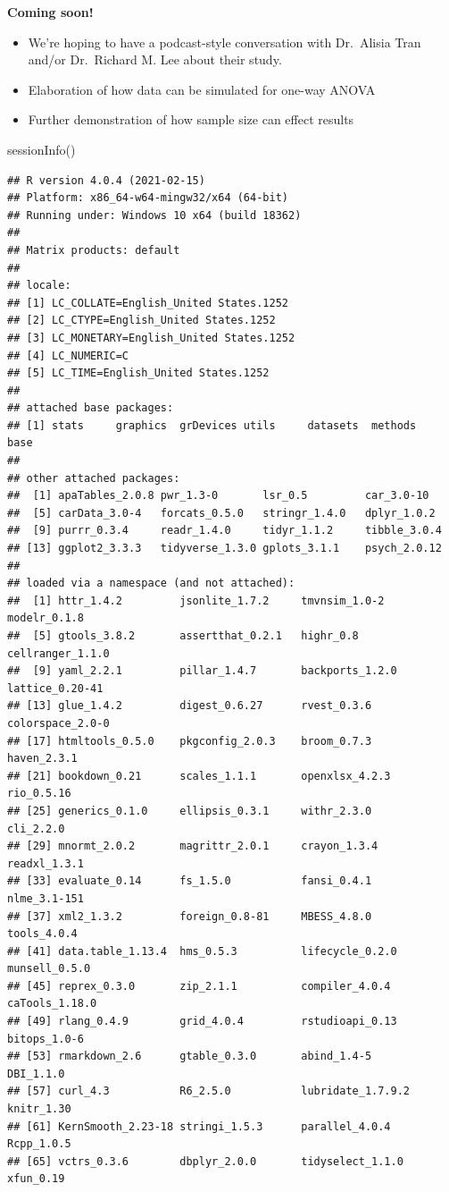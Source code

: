 \documentclass[
  english,
]{book}
\newenvironment{Shaded}{\begin{snugshade}}{\end{snugshade}}
\newcommand{\FunctionTok}[1]{\textcolor[rgb]{0.00,0.00,0.00}{#1}}
\newcommand{\NormalTok}[1]{#1}
\providecommand{\tightlist}{%
  \setlength{\itemsep}{0pt}\setlength{\parskip}{0pt}}
\begin{document}
\textbf{Coming soon!}

\begin{itemize}
\tightlist
\item
  We're hoping to have a podcast-style conversation with Dr.~Alisia Tran and/or Dr.~Richard M. Lee about their study.
\item
  Elaboration of how data can be simulated for one-way ANOVA
\item
  Further demonstration of how sample size can effect results
\end{itemize}

\begin{Shaded}
\begin{Highlighting}[]
\FunctionTok{sessionInfo}\NormalTok{()}
\end{Highlighting}
\end{Shaded}

\begin{verbatim}
## R version 4.0.4 (2021-02-15)
## Platform: x86_64-w64-mingw32/x64 (64-bit)
## Running under: Windows 10 x64 (build 18362)
## 
## Matrix products: default
## 
## locale:
## [1] LC_COLLATE=English_United States.1252 
## [2] LC_CTYPE=English_United States.1252   
## [3] LC_MONETARY=English_United States.1252
## [4] LC_NUMERIC=C                          
## [5] LC_TIME=English_United States.1252    
## 
## attached base packages:
## [1] stats     graphics  grDevices utils     datasets  methods   base     
## 
## other attached packages:
##  [1] apaTables_2.0.8 pwr_1.3-0       lsr_0.5         car_3.0-10     
##  [5] carData_3.0-4   forcats_0.5.0   stringr_1.4.0   dplyr_1.0.2    
##  [9] purrr_0.3.4     readr_1.4.0     tidyr_1.1.2     tibble_3.0.4   
## [13] ggplot2_3.3.3   tidyverse_1.3.0 gplots_3.1.1    psych_2.0.12   
## 
## loaded via a namespace (and not attached):
##  [1] httr_1.4.2         jsonlite_1.7.2     tmvnsim_1.0-2      modelr_0.1.8      
##  [5] gtools_3.8.2       assertthat_0.2.1   highr_0.8          cellranger_1.1.0  
##  [9] yaml_2.2.1         pillar_1.4.7       backports_1.2.0    lattice_0.20-41   
## [13] glue_1.4.2         digest_0.6.27      rvest_0.3.6        colorspace_2.0-0  
## [17] htmltools_0.5.0    pkgconfig_2.0.3    broom_0.7.3        haven_2.3.1       
## [21] bookdown_0.21      scales_1.1.1       openxlsx_4.2.3     rio_0.5.16        
## [25] generics_0.1.0     ellipsis_0.3.1     withr_2.3.0        cli_2.2.0         
## [29] mnormt_2.0.2       magrittr_2.0.1     crayon_1.3.4       readxl_1.3.1      
## [33] evaluate_0.14      fs_1.5.0           fansi_0.4.1        nlme_3.1-151      
## [37] xml2_1.3.2         foreign_0.8-81     MBESS_4.8.0        tools_4.0.4       
## [41] data.table_1.13.4  hms_0.5.3          lifecycle_0.2.0    munsell_0.5.0     
## [45] reprex_0.3.0       zip_2.1.1          compiler_4.0.4     caTools_1.18.0    
## [49] rlang_0.4.9        grid_4.0.4         rstudioapi_0.13    bitops_1.0-6      
## [53] rmarkdown_2.6      gtable_0.3.0       abind_1.4-5        DBI_1.1.0         
## [57] curl_4.3           R6_2.5.0           lubridate_1.7.9.2  knitr_1.30        
## [61] KernSmooth_2.23-18 stringi_1.5.3      parallel_4.0.4     Rcpp_1.0.5        
## [65] vctrs_0.3.6        dbplyr_2.0.0       tidyselect_1.1.0   xfun_0.19
\end{verbatim}

  
\end{document}
